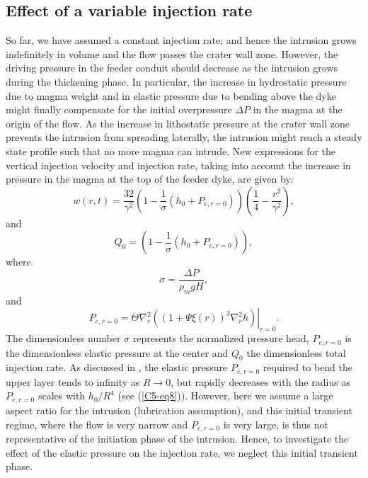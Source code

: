 \subsection{Effect of a variable injection rate}
\label{C5-Injection_Rate}
	 
So  far, we  have assumed  a constant  injection rate;  and hence  the
intrusion grows indefinitely in volume  and the flow passes the crater
wall zone.  However, the driving pressure in the feeder conduit should
decrease  as the  intrusion  grows during  the  thickening phase.   In
particular, the increase  in hydrostatic pressure due  to magma weight
and in  elastic pressure due to  bending above the dyke  might finally
compensate for the initial overpressure $\Delta P$ in the magma at the
origin of  the flow.  As the  increase in lithostatic pressure  at the
crater wall zone prevents the  intrusion from spreading laterally, the
intrusion might reach  a steady state profile such that  no more magma
can intrude. New  expressions for the vertical  injection velocity and
injection rate,  taking into account  the increase in pressure  in the
magma at the top of the feeder dyke, are given by:
\begin{equation}
  w(r,t)=\frac{32}{\gamma^{2}} \left(1-\frac{1}{\sigma}\left(h_0+P_{e,r=0} \right)\right)
  \left(\frac{1}{4}-\frac{r^{2}}{\gamma^{2}}\right),
  \label{C5-5.3}
\end{equation}
and
\begin{equation}
  Q_{0}=\left(1-\frac{1}{\sigma}\left(h_0+ P_{e,r=0}\right)\right),
  \label{C5-eq5.4}
\end{equation}
where
\begin{equation}
  \sigma=\frac{\Delta P}{\rho_{m}gH},
  \label{C5-eq5.4.5}
\end{equation}
and
\begin{equation}
  P_{e,r=0}= \Theta \nabla^{2}_{r}\left.\left ((1+\Psi \xi(r))^{3}\nabla^{2}_{r}h \right )\right|_{r=0}.
\end{equation}
The dimensionless  number $\sigma$ represents the  normalized pressure
head, $P_{e,r=0}$ is the dimensionless  elastic pressure at the center
and $Q_{0}$ the  dimensionless total injection rate.   As discussed in
\citet{Michaut:2011kg}, the  elastic pressure $P_{e,r=0}$  required to
bend  the upper  layer  tends  to infinity  as  $R\rightarrow 0$,  but
rapidly decreases with the radius as $P_{e,r=0}$ scales with $h_0/R^4$
(see (\ref{C5-eq8})). However, here we assume a large aspect ratio for
the  intrusion (lubrication  assumption), and  this initial  transient
regime, where the  flow is very narrow and $P_{e,r=0}$  is very large,
is  thus   not  representative   of  the   initiation  phase   of  the
intrusion. Hence, to investigate the effect of the elastic pressure on
the injection rate, we neglect this initial transient phase.

